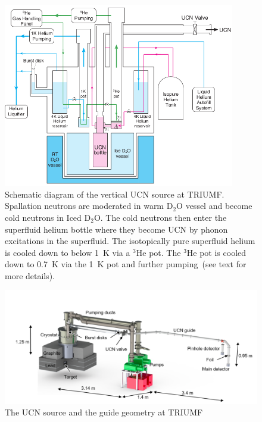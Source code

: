 \begin{figure}[h!]
  \centering
  \includegraphics[width=0.9\textwidth]{vertical_source.png}
  \caption[Schematic diagram of the vertical UCN source at
  TRIUMF]{Schematic diagram of the vertical UCN source at
    TRIUMF. Spallation neutrons are moderated in warm D$_2$O vessel
    and become cold neutrons in Iced D$_2$O. The cold neutrons then
    enter the superfluid helium bottle where they become UCN by phonon
    excitations in the superfluid. The isotopically pure superfluid
    helium is cooled down to below 1~K via a $^3$He pot. The $^3$He
    pot is cooled down to 0.7~K via the 1~K pot and further
    pumping~(see text for more details). }
  \label{fig:source}
\end{figure}




\begin{figure}[h!]
  \centering
  \includegraphics[width=1.1\textwidth]{Source_all.png}
  \caption{The UCN source and the guide geometry at TRIUMF}
  \label{fig:Source_all}
\end{figure}


